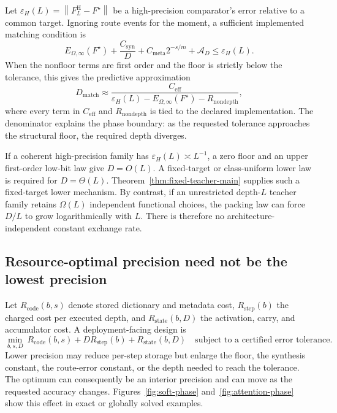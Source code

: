 \documentclass[twoside,11pt]{article}
\newcommand{\norm}[1]{\left\lVert #1\right\rVert}
\begin{document}
Let $\varepsilon_H(L)=\norm{F_L^{\mathrm H}-F^\star}$ be a high-precision comparator's error relative to a common target.  Ignoring route events for the moment, a sufficient implemented matching condition is
\begin{equation}
 E_{\Omega,\infty}(F^\star)
 +\frac{C_{\mathrm{syn}}}{D}
 +C_{\mathrm{meta}}2^{-s/m}
 +\mathcal A_D
 \le\varepsilon_H(L).
 \label{eq:matching-condition-main}
\end{equation}
When the nonfloor terms are first order and the floor is strictly below the tolerance, this gives the predictive approximation
\begin{equation}
 D_{\mathrm{match}}
 \approx
 \frac{C_{\mathrm{eff}}}
 {\varepsilon_H(L)-E_{\Omega,\infty}(F^\star)-R_{\mathrm{nondepth}}},
 \label{eq:predictive-matching-depth-main}
\end{equation}
where every term in $C_{\mathrm{eff}}$ and $R_{\mathrm{nondepth}}$ is tied to the declared implementation.  The denominator explains the phase boundary: as the requested tolerance approaches the structural floor, the required depth diverges.

If a coherent high-precision family has $\varepsilon_H(L)\asymp L^{-1}$, a zero floor and an upper first-order low-bit law give $D=O(L)$.  A fixed-target or class-uniform lower law is required for $D=\Theta(L)$.  Theorem~\ref{thm:fixed-teacher-main} supplies such a fixed-target lower mechanism.  By contrast, if an unrestricted depth-$L$ teacher family retains $\Omega(L)$ independent functional choices, the packing law can force $D/L$ to grow logarithmically with $L$.  There is therefore no architecture-independent constant exchange rate.

\subsection{Resource-optimal precision need not be the lowest precision}
\label{sec:resource-optimal-main}

Let $R_{\mathrm{code}}(b,s)$ denote stored dictionary and metadata cost, $R_{\mathrm{step}}(b)$ the charged cost per executed depth, and $R_{\mathrm{state}}(b,D)$ the activation, carry, and accumulator cost.  A deployment-facing design is
\begin{equation}
 \min_{b,s,D}
 \ R_{\mathrm{code}}(b,s)
 +D R_{\mathrm{step}}(b)
 +R_{\mathrm{state}}(b,D)
 \quad\text{subject to a certified error tolerance.}
 \label{eq:resource-optimum-main}
\end{equation}
Lower precision may reduce per-step storage but enlarge the floor, the synthesis constant, the route-error constant, or the depth needed to reach the tolerance.  The optimum can consequently be an interior precision and can move as the requested accuracy changes.  Figures~\ref{fig:soft-phase} and~\ref{fig:attention-phase} show this effect in exact or globally solved examples.
\end{document}
